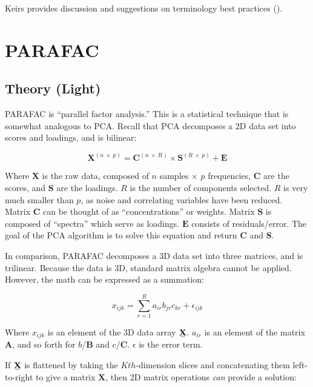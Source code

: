 \documentclass[letter,10pt,twocolumn,twoside,printwatermark=false]{pinp}
\begin{document}
Keirs provides discussion and suggestions on terminology best practices
(\cite{Kiers2000}).

\hypertarget{parafac}{%
\section{PARAFAC}\label{parafac}}

\hypertarget{theory-light}{%
\subsection{Theory (Light)}\label{theory-light}}

PARAFAC is ``parallel factor analysis.'' This is a statistical technique
that is somewhat analogous to PCA. Recall that PCA decomposes a 2D data
set into scores and loadings, and is bilinear:

\[
\mathbf{X}^{(n \ \times \ p)} = \mathbf{C}^{(n \ \times \ R)} \times \mathbf{S}^{(R \ \times \ p)} + \mathbf{E}
\]

Where \(\mathbf{X}\) is the raw data, composed of \(n\) samples
\(\times\) \(p\) frequencies, \(\mathbf{C}\) are the scores, and
\(\mathbf{S}\) are the loadings. \(R\) is the number of components
selected. \(R\) is very much smaller than \(p\), as noise and
correlating variables have been reduced. Matrix \(\mathbf{C}\) can be
thought of as ``concentrations'' or weights. Matrix \(\mathbf{S}\) is
composed of ``spectra'' which serve as loadings. \(\mathbf{E}\) consists
of residuals/error. The goal of the PCA algorithm is to solve this
equation and return \(\mathbf{C}\) and \(\mathbf{S}\).

In comparison, PARAFAC decomposes a 3D data set into three matrices, and
is trilinear. Because the data is 3D, standard matrix algebra cannot be
applied. However, the math can be expressed as a summation:

\[
x_{ijk} = \sum_{r = 1}^{R} a_{ir}b_{jr}c_{kr} + \epsilon_{ijk}
\]

Where \(x_{ijk}\) is an element of the 3D data array
\(\stackunder[1.2pt]{$\mathbf{X}$}{\rule{1.2ex}{.075ex}}\). \(a_{ir}\)
is an element of the matrix \(\mathbf{A}\), and so forth for
\(b\)/\(\mathbf{B}\) and \(c\)/\(\mathbf{C}\). \(\epsilon\) is the error
term.

If \(\stackunder[1.2pt]{$\mathbf{X}$}{\rule{1.2ex}{.075ex}}\) is
flattened by taking the \(Kth\)-dimension slices and concatenating them
left-to-right to give a matrix \(\mathbf{X}\), then 2D matrix operations
\emph{can} provide a solution:
\end{document}
